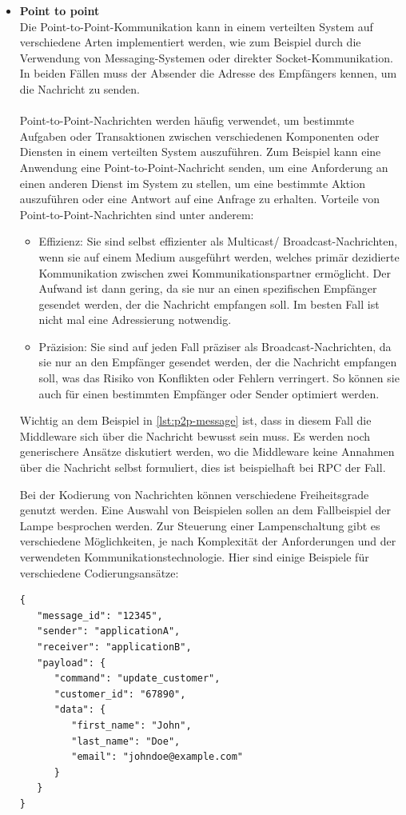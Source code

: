 \begin{itemize}
\item \textbf{Point to point}\\
Die Point-to-Point-Kommunikation kann in einem verteilten System auf verschiedene Arten implementiert werden, wie zum Beispiel durch die Verwendung von Messaging-Systemen oder direkter Socket-Kommunikation. In beiden Fällen muss der Absender die Adresse des Empfängers kennen, um die Nachricht zu senden.
\\\\
Point-to-Point-Nachrichten werden häufig verwendet, um bestimmte Aufgaben oder Transaktionen zwischen verschiedenen Komponenten oder Diensten in einem verteilten System auszuführen. Zum Beispiel kann eine Anwendung eine Point-to-Point-Nachricht senden, um eine Anforderung an einen anderen Dienst im System zu stellen, um eine bestimmte Aktion auszuführen oder eine Antwort auf eine Anfrage zu erhalten. Vorteile von Point-to-Point-Nachrichten sind unter anderem:
\begin{itemize}
\item Effizienz: Sie sind selbst effizienter als Multicast/ Broadcast-Nachrichten, wenn sie auf einem Medium ausgeführt werden, welches primär dezidierte Kommunikation zwischen zwei Kommunikationspartner ermöglicht. Der Aufwand ist dann gering, da sie nur an einen spezifischen Empfänger gesendet werden, der die Nachricht empfangen soll. Im besten Fall ist nicht mal eine Adressierung notwendig. 
\item Präzision: Sie sind auf jeden Fall präziser als Broadcast-Nachrichten, da sie nur an den Empfänger gesendet werden, der die Nachricht empfangen soll, was das Risiko von Konflikten oder Fehlern verringert. So können sie auch für einen bestimmten Empfänger oder Sender optimiert werden.
\end{itemize} 
Wichtig an dem Beispiel in \ref{lst:p2p-message} ist, dass in diesem Fall die Middleware sich über die Nachricht bewusst sein muss. Es werden noch generischere Ansätze diskutiert werden, wo die Middleware keine Annahmen über die Nachricht selbst formuliert, dies ist beispielhaft bei RPC der Fall. 

Bei der Kodierung von Nachrichten können verschiedene Freiheitsgrade genutzt werden. Eine Auswahl von Beispielen sollen an dem Fallbeispiel der Lampe besprochen werden. Zur Steuerung einer Lampenschaltung gibt es verschiedene Möglichkeiten, je nach Komplexität der Anforderungen und der verwendeten Kommunikationstechnologie. Hier sind einige Beispiele für verschiedene Codierungsansätze:
\newpage
\begin{lstlisting}[caption={Message für Point to Point Kommunikation},captionpos=b,label={lst:p2p-message}]
{
   "message_id": "12345",
   "sender": "applicationA",
   "receiver": "applicationB",
   "payload": {
      "command": "update_customer",
      "customer_id": "67890",
      "data": {
         "first_name": "John",
         "last_name": "Doe",
         "email": "johndoe@example.com"
      }
   }
}
\end{lstlisting}


\end{itemize}
